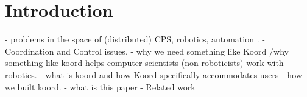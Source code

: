 \section{Introduction}
\label{sec:intro}
    - problems in the space of (distributed) CPS, robotics, automation .
    - Coordination and Control issues. 
    - why we need something like Koord /why something like koord helps computer scientists (non roboticists) work with robotics. 
    - what is koord and how Koord specifically accommodates users
    - how we built koord. 
    - what is this paper
    - Related work
